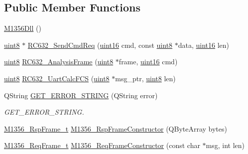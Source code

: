 \subsection*{Public Member Functions}
\begin{DoxyCompactItemize}
\item 
\mbox{\hyperlink{class_m1356_dll_a38686d41a3476f15cf676795806aff7d}{M1356\+Dll}} ()
\item 
\mbox{\hyperlink{inc_2m1356dll_8h_adde6aaee8457bee49c2a92621fe22b79}{uint8}} $\ast$ \mbox{\hyperlink{class_m1356_dll_a1fef83590eef30001297f59a7073d31e}{R\+C632\+\_\+\+Send\+Cmd\+Req}} (\mbox{\hyperlink{inc_2m1356dll_8h_a05f6b0ae8f6a6e135b0e290c25fe0e4e}{uint16}} cmd, const \mbox{\hyperlink{inc_2m1356dll_8h_adde6aaee8457bee49c2a92621fe22b79}{uint8}} $\ast$data, \mbox{\hyperlink{inc_2m1356dll_8h_a05f6b0ae8f6a6e135b0e290c25fe0e4e}{uint16}} len)
\item 
\mbox{\hyperlink{inc_2m1356dll_8h_adde6aaee8457bee49c2a92621fe22b79}{uint8}} \mbox{\hyperlink{class_m1356_dll_a40aed3801baa294bf828c5ab794ef82e}{R\+C632\+\_\+\+Analysis\+Frame}} (\mbox{\hyperlink{inc_2m1356dll_8h_adde6aaee8457bee49c2a92621fe22b79}{uint8}} $\ast$frame, \mbox{\hyperlink{inc_2m1356dll_8h_a05f6b0ae8f6a6e135b0e290c25fe0e4e}{uint16}} cmd)
\item 
\mbox{\hyperlink{inc_2m1356dll_8h_adde6aaee8457bee49c2a92621fe22b79}{uint8}} \mbox{\hyperlink{class_m1356_dll_a048d48e3154a48258d25391b19de938c}{R\+C632\+\_\+\+Uart\+Calc\+F\+CS}} (\mbox{\hyperlink{inc_2m1356dll_8h_adde6aaee8457bee49c2a92621fe22b79}{uint8}} $\ast$msg\+\_\+ptr, \mbox{\hyperlink{inc_2m1356dll_8h_adde6aaee8457bee49c2a92621fe22b79}{uint8}} len)
\item 
Q\+String \mbox{\hyperlink{class_m1356_dll_ad35a73433e99eb6ccce5f3729f7ae283}{G\+E\+T\+\_\+\+E\+R\+R\+O\+R\+\_\+\+S\+T\+R\+I\+NG}} (Q\+String error)
\begin{DoxyCompactList}\small\item\em G\+E\+T\+\_\+\+E\+R\+R\+O\+R\+\_\+\+S\+T\+R\+I\+NG. \end{DoxyCompactList}\item 
\mbox{\hyperlink{struct_m1356___rsp_frame__t}{M1356\+\_\+\+Rsp\+Frame\+\_\+t}} \mbox{\hyperlink{class_m1356_dll_a40131e8263bd201208a37ec1826d5310}{M1356\+\_\+\+Rsp\+Frame\+Constructor}} (Q\+Byte\+Array bytes)
\item 
\mbox{\hyperlink{struct_m1356___req_frame__t}{M1356\+\_\+\+Req\+Frame\+\_\+t}} \mbox{\hyperlink{class_m1356_dll_a44099cd5f4bbdf9f37507eb7fa5477d6}{M1356\+\_\+\+Req\+Frame\+Constructor}} (const char $\ast$msg, int len)

\end{DoxyCompactItemize}
